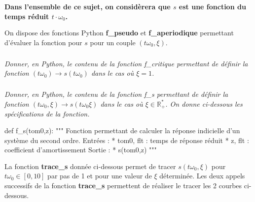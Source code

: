 \documentclass[10pt]{article}
\begin{document}
\begin{center}
\textbf{Dans l'ensemble de ce sujet, on considèrera que $s$ est une fonction du temps réduit $t\cdot\omega_0$.}
\end{center}


On dispose des fonctions Python \textbf{\textsf{f\_pseudo}} et \textbf{\textsf{f\_aperiodique}} permettant d'évaluer la fonction pour $s$ pour un couple $(t\omega_0,\xi)$.

\subparagraph{} \textit{Donner, en Python, le contenu de la fonction \textsf{f\_critique} permettant de définir la fonction $(t\omega_0) \rightarrow s(t\omega_0)$ dans le cas où $\xi=1$.}


\subparagraph{} \textit{Donner, en Python, le contenu de la fonction \textsf{f\_s} permettant de définir la fonction $(t\omega_0,\xi) \rightarrow s(t\omega_0\xi)$ dans le cas où $\xi\in \mathbb{R}_+^*$. On donne ci-dessous les spécifications de la fonction.}

\begin{py}
\begin{python}
def f_s(tom0,z):
    """
    Fonction permettant de calculer la réponse indicielle d'un système du second ordre. 
    Entrées : 
        * tom0, flt : temps de réponse réduit
        * z, flt : coefficient d'amortissement
    Sortie : 
        * s(tom0,z)
    """
\end{python}
\end{py}


La fonction \textbf{\textsf{trace\_s}} donnée ci-dessous permet de tracer $s(t\omega_0,\xi)$ pour $t\omega_0 \in [0,10]$ par pas de 1 et pour une valeur de $\xi$ déterminée. Les deux appels successifs de la fonction \textbf{\textsf{trace\_s}} permettent de réaliser le tracer les 2 courbes ci-dessous.
\end{document}
